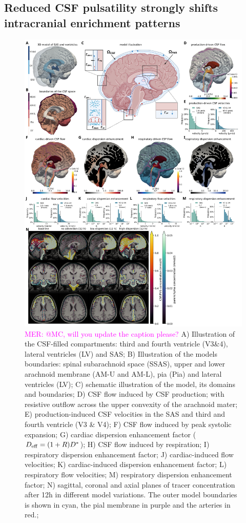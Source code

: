 \documentclass[fleqn,10pt]{wlscirep}
\newcommand{\mer}[1]{\textcolor{magenta}{#1}}
\begin{document}
\subsection*{Reduced CSF pulsatility strongly shifts intracranial enrichment patterns}
\begin{figure}%
\centering 
\includegraphics[width = 0.9\linewidth]{figures/figure2.png}
\caption{\mer{MER: @MC, will you update the caption please?}
A) Illustration of the CSF-filled compartments: third and fourth ventricle (V3\&4), lateral ventricles (LV) and SAS; 
B) Illustration of the models boundaries: spinal subarachnoid space (SSAS), upper and lower arachnoid membrane (AM-U and AM-L), pia (Pia) and lateral ventricles (LV); 
C) schematic illustration of the model, its domains and boundaries; 
D) CSF flow induced by CSF production; with resistive outflow across the
upper convexity of the arachnoid mater; 
E) production-induced CSF velocities in the SAS and third and fourth ventricle (V3 \& V4); 
F) CSF flow induced by peak systolic expansion; 
G) cardiac dispersion enhancement factor ($D_{\rm eff} = (1 + R) D^{\ast}$);
H) CSF flow induced by respiration; 
I) respiratory dispersion enhancement factor;
J) cardiac-induced flow velocities;
K) cardiac-induced dispersion enhancement factor;
L) respiratory flow velocities;
M) respiratory dispersion enhancement factor;
N) sagittal, coronal and axial planes of tracer concentration after 12h in different model variations. The outer model boundaries is shown in cyan, the pial membrane in purple and the arteries in red.;
}
\label{fig:csf}
\end{figure}  
\end{document}
